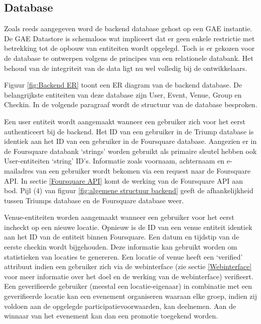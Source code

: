\subsection{Database}
Zoals reeds aangegeven word de backend database gehost op een GAE instantie. De GAE Datastore is schemaloos wat impliceert dat er geen enkele restrictie met betrekking tot de opbouw van entiteiten wordt opgelegd. Toch is er gekozen voor de database te ontwerpen volgens de principes van een relationele databank. Het behoud van de integriteit van de data ligt nu wel volledig bij de ontwikkelaars. 

Figuur \ref{fig:Backend ER} toont een ER diagram van de backend database.  De belangrijkste entiteiten van deze database zijn User, Event, Venue, Group en Checkin. In de volgende paragraaf wordt de structuur van de database besproken. 

Een user entiteit wordt aangemaakt wanneer een gebruiker zich voor het eerst authenticeert bij de backend. Het ID van een gebruiker in de Triump database is identiek aan het ID van een gebruiker in de Foursquare database. Aangezien er in de Foursquare databank `strings' worden gebruikt als primaire sleutel hebben ook User-entiteiten `string' ID's.  Informatie zoals voornaam, achternaam en e-mailadres van een gebruiker wordt bekomen via een request naar de Foursquare API. In sectie \ref{Foursquare API} komt de werking van de Foursquare API aan bod. Pijl (4) van figuur \ref{fig:algemene structuur backend} geeft de afhankelijkheid tussen Triumps database en de Foursquare database weer.

Venue-entiteiten worden aangemaakt wanneer een gebruiker voor het eerst incheckt op een nieuwe locatie. Opnieuw is de ID van een venue entiteit identiek aan het ID van de entiteit binnen Foursquare. Een datum en tijdstip van de eerste checkin wordt bijgehouden. Deze informatie kan gebruikt worden om statistieken van locaties te genereren. Een locatie of venue heeft een `verified' attribuut indien een gebruiker zich via de webinterface (zie sectie \ref{Webinterface} voor meer informatie over het doel en de werking van de webinterface) verifieert. Een geverifieerde gebruiker (meestal een locatie-eigenaar) in combinatie met een geverifieerde locatie kan een evenement organiseren waaraan elke groep, indien zij voldoen aan de opgelegde participatievoorwaarden, kan deelnemen. Aan de winnaar van het evenement kan dan een promotie toegekend worden.

